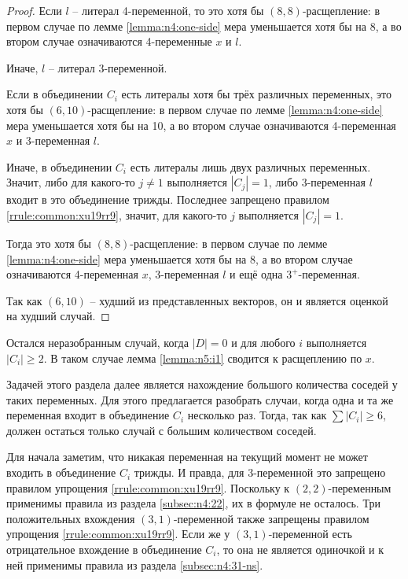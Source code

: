 \begin{proof}
 Если $l$ -- литерал 4-переменной, то это хотя бы $(8,8)$-расщепление: в первом случае по лемме \ref{lemma:n4:one-side} мера уменьшается хотя бы на 8, а во втором случае означиваются 4-переменные $x$ и $l$.

 Иначе, $l$ -- литерал 3-переменной.

 Если в объединении $C_i$ есть литералы хотя бы трёх различных переменных, это хотя бы $(6,10)$-расщепление: в первом случае по лемме \ref{lemma:n4:one-side} мера уменьшается хотя бы на 10, а во втором случае означиваются 4-переменная $x$ и 3-переменная $l$.

 Иначе, в объединении $C_i$ есть литералы лишь двух различных переменных.
 Значит, либо для какого-то $j \neq 1$ выполняется $|C_j| = 1$, либо 3-переменная $l$ входит в это объединение трижды. Последнее запрещено правилом \ref{rrule:common:xu19rr9}, значит, для какого-то $j$ выполняется $|C_j| = 1$.

 Тогда это хотя бы $(8,8)$-расщепление: в первом случае по лемме \ref{lemma:n4:one-side} мера уменьшается хотя бы на 8, а во втором случае означиваются 4-переменная $x$, 3-переменная $l$ и ещё одна $3^+$-переменная.

 Так как $(6,10)$ -- худший из представленных векторов, он и является оценкой на худший случай.
\end{proof}

Остался неразобранным случай, когда $|D| = 0$ и для любого $i$ выполняется $|C_i| \geq 2$.
В таком случае лемма \ref{lemma:n5:i1} сводится к расщеплению по $x$.

Задачей этого раздела далее является нахождение большого количества соседей у таких переменных.
Для этого предлагается разобрать случаи, когда одна и та же переменная входит в объединение $C_i$ несколько раз.
Тогда, так как $\sum |C_i| \geq 6$, должен остаться только случай с большим количеством соседей.

Для начала заметим, что никакая переменная на текущий момент не может входить в объединение $C_i$ трижды. И правда, для 3-переменной это запрещено правилом упрощения \ref{rrule:common:xu19rr9}. Поскольку к $(2,2)$-переменным применимы правила из раздела \ref{subsec:n4:22}, их в формуле не осталось. Три положительных вхождения $(3,1)$-переменной также запрещены правилом упрощения \ref{rrule:common:xu19rr9}. Если же у $(3,1)$-переменной есть отрицательное вхождение в объединение $C_i$, то она не является одиночкой и к ней применимы правила из раздела \ref{subsec:n4:31-ns}.


